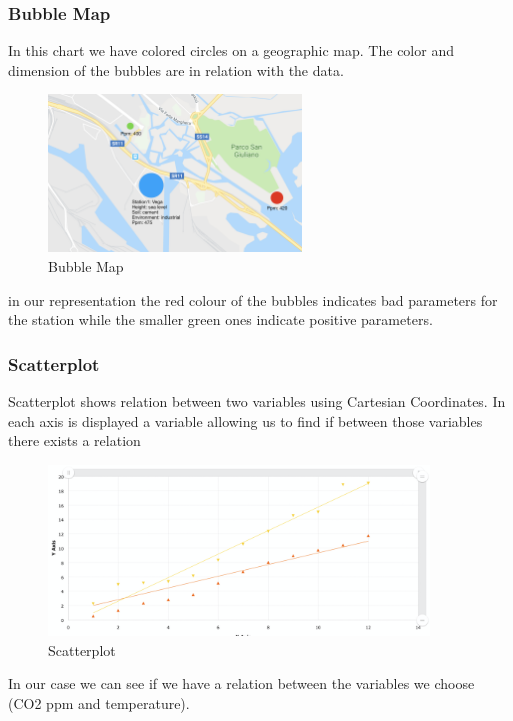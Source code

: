\documentclass[12pt]{article} %
\begin{document}
\subsubsection{Bubble Map}
In this chart we have colored circles on a geographic map. The color and dimension of the bubbles are in relation with the data.
\begin{figure}[H]
  \centering
  \includegraphics[width=0.6\textwidth]{img/bubbleMap.png}
  \caption{Bubble Map}
  \label{fig:bublMap}
\end{figure}
in our representation the red colour of the bubbles indicates bad parameters for the station while the smaller green ones indicate positive parameters.

\subsubsection{Scatterplot}
Scatterplot shows relation between two variables using Cartesian Coordinates.
In each axis is displayed a variable allowing us to find if between those variables there exists a relation
\begin{figure}[H]
  \centering
  \includegraphics[width=0.9\textwidth]{img/scatter_chart.png}
  \caption{Scatterplot}
  \label{fig:scttrPlot}
\end{figure}
In our case we can see if we have a relation between the variables we choose (CO2 ppm and temperature).

\newpage
\end{document}
